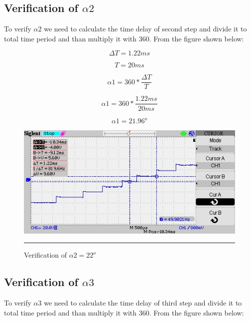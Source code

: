 \subsection{Verification of $\alpha2$ }
To verify $\alpha2$ we need to calculate the time delay of second step and divide it to total time period and than multiply it with 360.
From the figure shown below:

\begin{equation}
\Delta T = 1.22ms
\end{equation}

\begin{equation}
T = 20ms
\end{equation}

\begin{equation}
\alpha1 = 360*\frac{\Delta T}{T}
\end{equation}

\begin{equation}
\alpha1 = 360*\frac{1.22ms}{20ms}
\end{equation}

\begin{equation}
\alpha1 = 21.96^o
\end{equation}

\begin{figure}[htbp]
	\centering
	\includegraphics[width = 6in]{./Figures/Photos/Hardware/22}
	\rule{35em}{1pt}
	\caption{Verification of $\alpha2 = 22^o$}
\end{figure}

\newpage
\subsection{Verification of $\alpha3$ }
To verify $\alpha3$ we need to calculate the time delay of third step and divide it to total time period and than multiply it with 360.
From the figure shown below:

